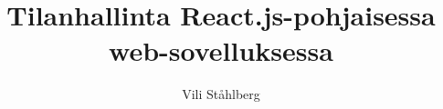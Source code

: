 \documentclass[a4paper,12pt,language=finnish,version=final,hidechapters=true,includereferences=false,realtimesnewroman=false,sharelatex=true,emptyfirstpages=true,minted=true]{utuftthesis}
\begin{document}




\title{Tilanhallinta React.js-pohjaisessa web-sovelluksessa}
\author{Vili Ståhlberg}

\maketitle


\pagestyle{empty}

\tableofcontents



%
%








\begin{comment}
The thesis main content ends here.
\end{comment}
\printbibliography

\begin{comment}
Create your appendix chapters with command \textbackslash appchapter\{some
name\} instead of \textbackslash chapter\{some name\} for the automagic
page counting to work!
\end{comment}


\begin{comment}
main document ends here
\end{comment}
\end{document}
